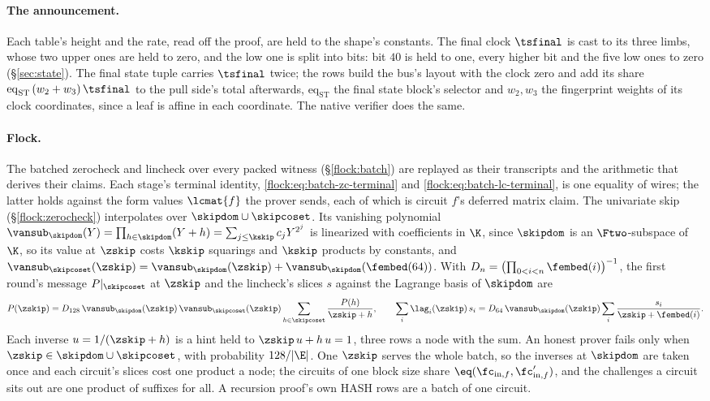 \paragraph{The announcement.} Each table's height and the rate, read off the proof, are held to the shape's constants. The final clock $\tsfinal$ is cast to its three limbs, whose two upper ones are held to zero, and the low one is split into bits: bit $40$ is held to one, every higher bit and the five low ones to zero (\S\ref{sec:state}). The final state tuple carries $\tsfinal$ twice; the rows build the bus's layout with the clock zero and add its share $\mathrm{eq}_{\mathrm{ST}}\,(w_2+w_3)\,\tsfinal$ to the pull side's total afterwards, $\mathrm{eq}_{\mathrm{ST}}$ the final state block's selector and $w_2,w_3$ the fingerprint weights of its clock coordinates, since a leaf is affine in each coordinate. The native verifier does the same.

\paragraph{Flock.} The batched zerocheck and lincheck over every packed witness (\S\ref{flock:batch}) are replayed as their transcripts and the arithmetic that derives their claims. Each stage's terminal identity, \eqref{flock:eq:batch-zc-terminal} and \eqref{flock:eq:batch-lc-terminal}, is one equality of wires; the latter holds against the form values $\lcmat{f}$ the prover sends, each of which is circuit $f$'s deferred matrix claim. The univariate skip (\S\ref{flock:zerocheck}) interpolates over $\skipdom\cup\skipcoset$. Its vanishing polynomial $\vansub_{\skipdom}(Y)=\prod_{h\in\skipdom}(Y+h)=\sum_{j\le\kskip}c_jY^{2^j}$ is linearized with coefficients in $\K$, since $\skipdom$ is an $\Ftwo$-subspace of $\K$, so its value at $\zskip$ costs $\kskip$ squarings and $\kskip$ products by constants, and $\vansub_{\skipcoset}(\zskip)=\vansub_{\skipdom}(\zskip)+\vansub_{\skipdom}(\fembed(64))$. With $D_n=\bigl(\prod_{0<i<n}\fembed(i)\bigr)^{-1}$, the first round's message $P|_{\skipcoset}$ at $\zskip$ and the lincheck's slices $s$ against the Lagrange basis of $\skipdom$ are
\[
  P(\zskip)=D_{128}\,\vansub_{\skipdom}(\zskip)\,\vansub_{\skipcoset}(\zskip)\sum_{h\in\skipcoset}\frac{P(h)}{\zskip+h},\qquad
  \sum_i\lag_i(\zskip)\,s_i=D_{64}\,\vansub_{\skipdom}(\zskip)\sum_{i}\frac{s_i}{\zskip+\fembed(i)}.
\]
Each inverse $u=1/(\zskip+h)$ is a hint held to $\zskip\,u+h\,u=1$, three rows a node with the sum. An honest prover fails only when $\zskip\in\skipdom\cup\skipcoset$, with probability $128/|\E|$. One $\zskip$ serves the whole batch, so the inverses at $\skipdom$ are taken once and each circuit's slices cost one product a node; the circuits of one block size share $\eq(\fc_{\mathrm{in},f},\fc'_{\mathrm{in},f})$, and the challenges a circuit sits out are one product of suffixes for all. A recursion proof's own \textsf{HASH} rows are a batch of one circuit.

